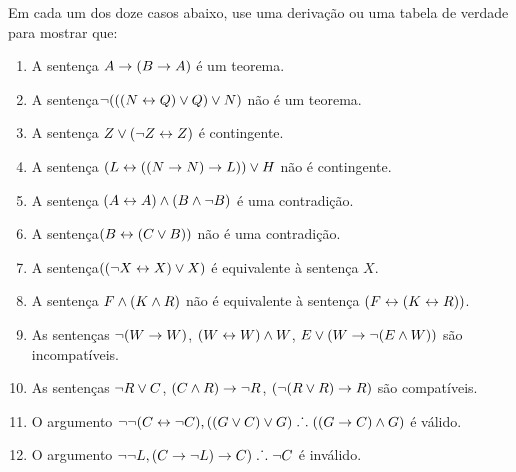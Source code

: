 \noindent\problempart Em cada um dos doze casos abaixo, use uma  derivação ou uma tabela de verdade para mostrar que:
\begin{enumerate}%
\item A sentença $A \rightarrow (B \rightarrow A)$ é um teorema.
\item A sentença$\neg (((N \leftrightarrow Q) \vee Q) \vee N)$ não é um teorema.
\item A sentença $ Z \vee (\neg Z \leftrightarrow Z) $ é contingente.
\item A sentença $ (L \leftrightarrow ((N \rightarrow N) \rightarrow L)) \vee H $ não é contingente.
\item A sentença $ (A \leftrightarrow A) \wedge (B \wedge \neg B)$ é uma contradição.
\item A sentença$ (B \leftrightarrow (C \vee B)) $ não é uma contradição. 
\item A sentença$ ((\neg X \leftrightarrow X) \vee X) $  é equivalente à sentença $X$.
\item A sentença $F \wedge (K \wedge R) $ não  é equivalente à sentença $ (F \leftrightarrow (K \leftrightarrow R)) $.
\item As sentenças $ \neg (W \rightarrow W)$, $(W \leftrightarrow W) \wedge W$, $E \vee (W \rightarrow \neg (E \wedge W))$ são incompatíveis. 

\item As sentenças  $\neg R \vee C $, $(C \wedge R) \rightarrow \neg R$, $(\neg (R \vee R) \rightarrow R) $ são compatíveis.
\item O argumento $\neg \neg (C \leftrightarrow \neg C), ((G \vee C) \vee G) \mathrel{\ldotp\dot{}\,\ldotp} ((G \rightarrow C) \wedge G) $ é válido.
\item O argumento $ \neg \neg L,  (C \rightarrow \neg L) \rightarrow C) \mathrel{\ldotp\dot{}\,\ldotp} \neg C$  é  inválido.
\end{enumerate}

